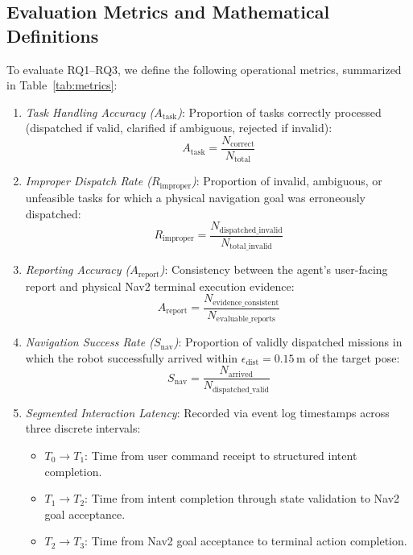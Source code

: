 \documentclass[conference]{IEEEtran}
\begin{document}
\subsection{Evaluation Metrics and Mathematical Definitions}
To evaluate RQ1–RQ3, we define the following operational metrics, summarized in Table~\ref{tab:metrics}:
\begin{enumerate}
    \item \textit{Task Handling Accuracy ($A_{\text{task}}$)}: Proportion of tasks correctly processed (dispatched if valid, clarified if ambiguous, rejected if invalid):
    \begin{equation}
    A_{\text{task}} = \frac{N_{\text{correct}}}{N_{\text{total}}}
    \end{equation}
    \item \textit{Improper Dispatch Rate ($R_{\text{improper}}$)}: Proportion of invalid, ambiguous, or unfeasible tasks for which a physical navigation goal was erroneously dispatched:
    \begin{equation}
    R_{\text{improper}} = \frac{N_{\text{dispatched\_invalid}}}{N_{\text{total\_invalid}}}
    \end{equation}
    \item \textit{Reporting Accuracy ($A_{\text{report}}$)}: Consistency between the agent's user-facing report and physical Nav2 terminal execution evidence:
    \begin{equation}
    A_{\text{report}} = \frac{N_{\text{evidence\_consistent}}}{N_{\text{evaluable\_reports}}}
    \end{equation}
    \item \textit{Navigation Success Rate ($S_{\text{nav}}$)}: Proportion of validly dispatched missions in which the robot successfully arrived within $\epsilon_{\text{dist}} = 0.15\,\text{m}$ of the target pose:
    \begin{equation}
    S_{\text{nav}} = \frac{N_{\text{arrived}}}{N_{\text{dispatched\_valid}}}
    \end{equation}
    \item \textit{Segmented Interaction Latency}: Recorded via event log timestamps across three discrete intervals:
    \begin{itemize}
        \item $T_0 \to T_1$: Time from user command receipt to structured intent completion.
        \item $T_1 \to T_2$: Time from intent completion through state validation to Nav2 goal acceptance.
        \item $T_2 \to T_3$: Time from Nav2 goal acceptance to terminal action completion.
    \end{itemize}
\end{enumerate}
\end{document}

